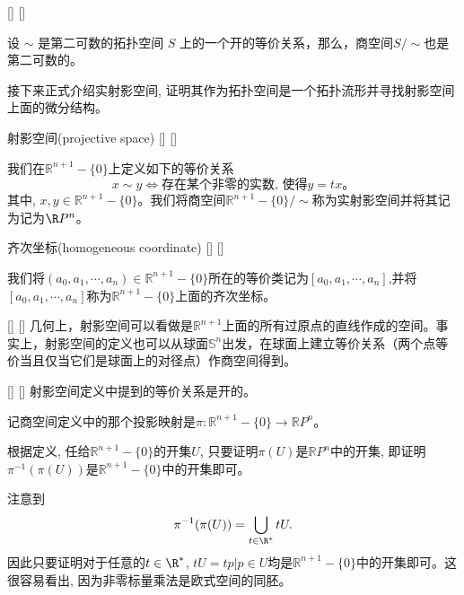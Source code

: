 \documentclass[UTF8]{ctexart}
\begin{document}
    \begin{crl}
        []
        {}
        []
        []

    \label{corollorytwosecond}
        设 \( \sim \) 是第二可数的拓扑空间 \( S \) 上的一个开的等价关系，那么，商空间$S/\sim$也是第二可数的。
    \end{crl}

    接下来正式介绍实射影空间, 证明其作为拓扑空间是一个拓扑流形并寻找射影空间上面的微分结构。

    \begin{dfn}
        []
        {射影空间(projective space)}
        []
        []

        我们在$\mathbb{R}^{n+1}-\{0\}$上定义如下的等价关系
        \[
            x \sim y \Leftrightarrow \text{存在某个非零的实数, 使得}y = tx。
        \]
        其中, $x , y \in \mathbb{R}^{n+1}-\{0\}$。我们将商空间$\mathbb{R}^{n+1}-\{0\} / \sim$称为实射影空间并将其记为记为$\R P^n$。
    \end{dfn}

    \begin{dfn}
        []
        {齐次坐标(homogeneous coordinate)}
        []
        []

        我们将$(a_0 , a_1 , \cdots , a_n) \in \mathbb{R}^{n+1}-\{0\}$所在的等价类记为$[a_0 , a_1 , \cdots , a_n]$,并将$[a_0 , a_1 , \cdots , a_n]$称为$\mathbb{R}^{n+1}-\{0\}$上面的齐次坐标。
    \end{dfn}

    \begin{rmk}
        []
        {}
        []
        []
        几何上，射影空间可以看做是$\mathbb{R}^{n+1}$上面的所有过原点的直线作成的空间。事实上，射影空间的定义也可以从球面$\mathbb{S}^n$出发，在球面上建立等价关系（两个点等价当且仅当它们是球面上的对径点）作商空间得到。
    \end{rmk}

    \begin{ppt}
        []
        {}
        []
        []
        射影空间定义中提到的等价关系是开的。
    \end{ppt}

    \begin{prf}
        
        
        
        

        记商空间定义中的那个投影映射是$\pi : \mathbb{R}^{n+1} - \{0\} \rightarrow \mathbb{R}P^n$。
        
        根据定义, 任给$\mathbb{R}^{n+1} - \{0\}$的开集$U$, 只要证明$\pi(U)$是$\mathbb{R}P^n$中的开集, 即证明$\pi^{-1}(\pi(U))$是$\mathbb{R}^{n+1} - \{0\}$中的开集即可。

        注意到
        \[
           \pi^{-1}(\pi(U)) = \bigcup_{t \in \R^{*}} tU. 
        \]
        因此只要证明对于任意的$t \in \R^{*}$, $t U = {t p | p \in U}$均是$\mathbb{R}^{n+1} - \{0\}$中的开集即可。这很容易看出, 因为非零标量乘法是欧式空间的同胚。
    \end{prf}
\end{document}
